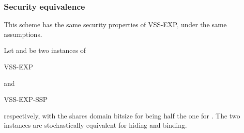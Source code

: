 \documentclass[10pt,journal,cspaper,compsoc]{IEEEtran}
\begin{document}
\subsubsection{Security equivalence}
This scheme has the same security properties of VSS-EXP, under the same assumptions.

\begin{thm}
Let  and  be two
instances of \begin{small}VSS-EXP\end{small} and
\begin{small}VSS-EXP-SSP\end{small}
respectively, with the shares domain bitsize
for  being half the one for
.
The two instances are stochastically equivalent
for hiding and binding.
\end{thm}
\end{document}
